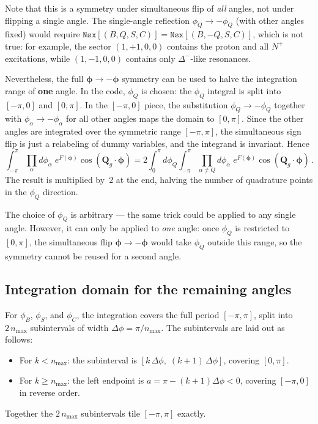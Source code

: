 \documentclass[11pt,a4paper]{article}
\newcommand{\bphi}{\bm{\phi}}
\newcommand{\bQ}{\bm{Q}}
\begin{document}
Note that this is a symmetry under simultaneous flip of \emph{all} angles, not under flipping a single angle.
The single-angle reflection $\phi_Q \to -\phi_Q$ (with other angles fixed) would require $\texttt{Nsx}[(B,Q,S,C)] = \texttt{Nsx}[(B,-Q,S,C)]$, which is not true: for example, the sector $(1,+1,0,0)$ contains the proton and all $N^+$ excitations, while $(1,-1,0,0)$ contains only $\Delta^-$-like resonances.

Nevertheless, the full $\bphi \to -\bphi$ symmetry can be used to halve the integration range of \textbf{one} angle.
In the code, $\phi_Q$ is chosen: the $\phi_Q$ integral is split into $[-\pi, 0]$ and $[0, \pi]$.
In the $[-\pi, 0]$ piece, the substitution $\phi_Q \to -\phi_Q$ together with $\phi_\alpha \to -\phi_\alpha$ for all other angles maps the domain to $[0, \pi]$.
Since the other angles are integrated over the symmetric range $[-\pi, \pi]$, the simultaneous sign flip is just a relabeling of dummy variables, and the integrand is invariant.
Hence
\begin{equation}
  \int_{-\pi}^{\pi} \!\prod_\alpha d\phi_\alpha\; e^{F(\bphi)}\cos(\bQ_g\!\cdot\!\bphi)
  = 2\!\int_0^{\pi}\!d\phi_Q \int_{-\pi}^{\pi}\!\prod_{\alpha \neq Q} d\phi_\alpha\; e^{F(\bphi)}\cos(\bQ_g\!\cdot\!\bphi)\,.
\end{equation}
The result is multiplied by~2 at the end, halving the number of quadrature points in the $\phi_Q$ direction.

The choice of $\phi_Q$ is arbitrary --- the same trick could be applied to any single angle.
However, it can only be applied to \emph{one} angle: once $\phi_Q$ is restricted to $[0, \pi]$, the simultaneous flip $\bphi \to -\bphi$ would take $\phi_Q$ outside this range, so the symmetry cannot be reused for a second angle.

\subsection{Integration domain for the remaining angles}
\label{sec:subinterval-ordering}

For $\phi_B$, $\phi_S$, and $\phi_C$, the integration covers the full period $[-\pi, \pi]$, split into $2\,n_{\max}$ subintervals of width $\Delta\phi = \pi/n_{\max}$.
The subintervals are laid out as follows:
\begin{itemize}
  \item For $k < n_{\max}$: the subinterval is $[k\,\Delta\phi,\;(k+1)\,\Delta\phi]$, covering $[0, \pi]$.
  \item For $k \geq n_{\max}$: the left endpoint is $a = \pi - (k+1)\Delta\phi < 0$, covering $[-\pi, 0]$ in reverse order.
\end{itemize}
Together the $2\,n_{\max}$ subintervals tile $[-\pi, \pi]$ exactly.
\end{document}
